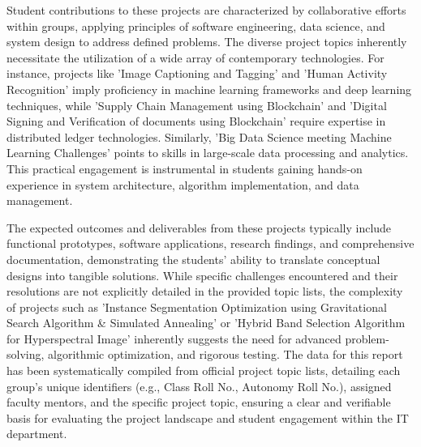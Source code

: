 \documentclass[11pt,a4paper]{article}
\newenvironment{card}{
    \begin{tcolorbox}[
        enhanced,
        colback=cardback,
        colframe=border,
        sharp corners,
        boxrule=0.5pt,
        drop shadow,
        drop shadow={shadow xshift=1mm,shadow yshift=-1mm,fill=border!50},
        boxsep=3mm,
        left=5mm, right=5mm, top=5mm, bottom=5mm,
        width=\textwidth,
        nobeforeafter
    ]
}{\end{tcolorbox}}
\begin{document}
\begin{card}
    Student contributions to these projects are characterized by collaborative efforts within groups, applying principles of software engineering, data science, and system design to address defined problems. The diverse project topics inherently necessitate the utilization of a wide array of contemporary technologies. For instance, projects like 'Image Captioning and Tagging' and 'Human Activity Recognition' imply proficiency in machine learning frameworks and deep learning techniques, while 'Supply Chain Management using Blockchain' and 'Digital Signing and Verification of documents using Blockchain' require expertise in distributed ledger technologies. Similarly, 'Big Data Science meeting Machine Learning Challenges' points to skills in large-scale data processing and analytics. This practical engagement is instrumental in students gaining hands-on experience in system architecture, algorithm implementation, and data management.

    The expected outcomes and deliverables from these projects typically include functional prototypes, software applications, research findings, and comprehensive documentation, demonstrating the students' ability to translate conceptual designs into tangible solutions. While specific challenges encountered and their resolutions are not explicitly detailed in the provided topic lists, the complexity of projects such as 'Instance Segmentation Optimization using Gravitational Search Algorithm \& Simulated Annealing' or 'Hybrid Band Selection Algorithm for Hyperspectral Image' inherently suggests the need for advanced problem-solving, algorithmic optimization, and rigorous testing. The data for this report has been systematically compiled from official project topic lists, detailing each group's unique identifiers (e.g., Class Roll No., Autonomy Roll No.), assigned faculty mentors, and the specific project topic, ensuring a clear and verifiable basis for evaluating the project landscape and student engagement within the IT department.
\end{card}

\vspace{0.5cm}
\end{document}
